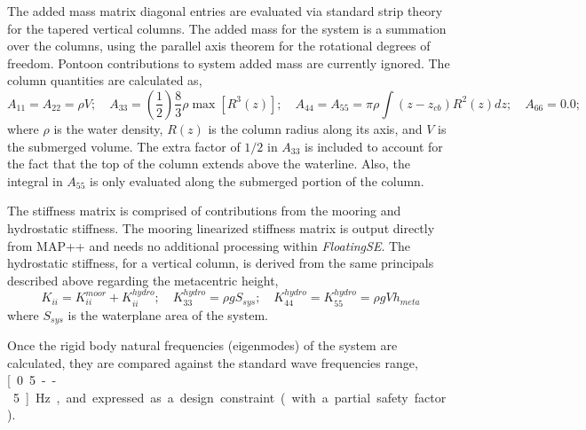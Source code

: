 The added mass matrix diagonal entries are evaluated via standard strip
theory for the tapered vertical columns.  The added mass for the system is a
summation over the columns, using the parallel axis theorem for the
rotational degrees of freedom.  Pontoon contributions to system added
mass are currently ignored.  The column quantities are calculated as,
\begin{equation}
  A_{11} = A_{22} = \rho V;\quad A_{33} = 
  \left(\frac{1}{2}\right)\frac{8}{3} \rho \max \left[ R^3(z)\right] ; \quad A_{44} =
  A_{55} = \pi\rho\int\left(z-z_{cb}\right)R^2(z)dz;\quad A_{66} = 0.0;
\end{equation}
where $\rho$ is the water density, $R(z)$ is the column radius along its
axis, and $V$ is the submerged volume.  The extra factor of $1/2$ in
$A_{33}$ is included to account for the fact that the top of the column
extends above the waterline.  Also, the integral in $A_{55}$ is only evaluated
along the submerged portion of the column.

The stiffness matrix is comprised of contributions from the mooring
and hydrostatic stiffness.  The mooring linearized stiffness matrix is output
directly from MAP++ and needs no additional processing within
\textit{FloatingSE}.  The hydrostatic stiffness, for a vertical column, is derived from the same
principals described above regarding the metacentric height,
\begin{equation}
  K_{ii} = K_{ii}^{moor} + K_{ii}^{hydro};\quad K_{33}^{hydro} = \rho g
  S_{sys};\quad K_{44}^{hydro} =  K_{55}^{hydro} = \rho g V h_{meta}
\end{equation}
where $S_{sys}$ is the waterplane area of the system.

Once the rigid body natural frequencies (eigenmodes) of the system are
calculated, they are compared against the standard wave frequencies
range, \unit[0.5--5]{Hz}, and expressed as a design constraint (with a
partial safety factor).

